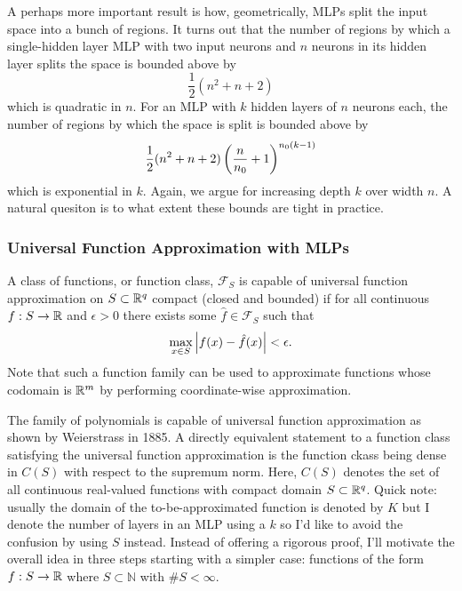 \documentclass[11pt]{article}
\begin{document}
\begin{tcolorbox}[title={\centering\textbf{Further advocating for depth over width}}, colback=myLightBlue, colbacktitle=myDarkBlue, colframe=myDarkBlue, coltitle=white]
    A perhaps more important result is how, geometrically, MLPs split the input space into a bunch of regions. It turns out that the number of regions by which a single-hidden layer MLP with two input neurons and $n$ neurons in its hidden layer splits the space is bounded above by
    $$
    \frac{1}{2}(n^2+n+2)
    $$
    which is quadratic in $n$. For an MLP with $k$ hidden layers of $n$ neurons each, the number of regions by which the space is split is bounded above by
    $$
    \frac{1}{2}(n^2+n+2)\left(\frac{n}{n_0}+1\right)^{n_0(k-1)}
    $$
    which is exponential in $k$. Again, we argue for increasing depth $k$ over width $n$. A natural quesiton is to what extent these bounds are tight in practice.
\end{tcolorbox}

\subsubsection{Universal Function Approximation with MLPs}
\label{subsubsec:universal_function_approximation_theorem}
A class of functions, or function class, $\mathcal{F}_S$ is capable of universal function approximation on $S\subset\mathbb{R}^q$ compact (closed and bounded) if for all continuous $f:S\to\mathbb{R}$ and $\epsilon>0$ there exists some $\hat{f}\in\mathcal{F}_S$ such that
$$
\max_{x\in S}\left|f(x)-\hat{f}(x)\right|<\epsilon.
$$
Note that such a function family can be used to approximate functions whose codomain is $\mathbb{R}^m$ by performing coordinate-wise approximation. 

The family of polynomials is capable of universal function approximation as shown by Weierstrass in 1885. A directly equivalent statement to a function class satisfying the universal function approximation is the function ckass being dense in $C(S)$ with respect to the supremum norm. Here, $C(S)$ denotes the set of all continuous real-valued functions with compact domain $S\subset\mathbb{R}^q$. Quick note: usually the domain of the to-be-approximated function is denoted by $K$ but I denote the number of layers in an MLP using a $k$ so I'd like to avoid the confusion by using $S$ instead. Instead of offering a rigorous proof, I'll motivate the overall idea in three steps starting with a simpler case: functions of the form $f:S\to\mathbb{R}$ where $S\subset\mathbb{N}$ with $\#S<\infty$.
\end{document}
